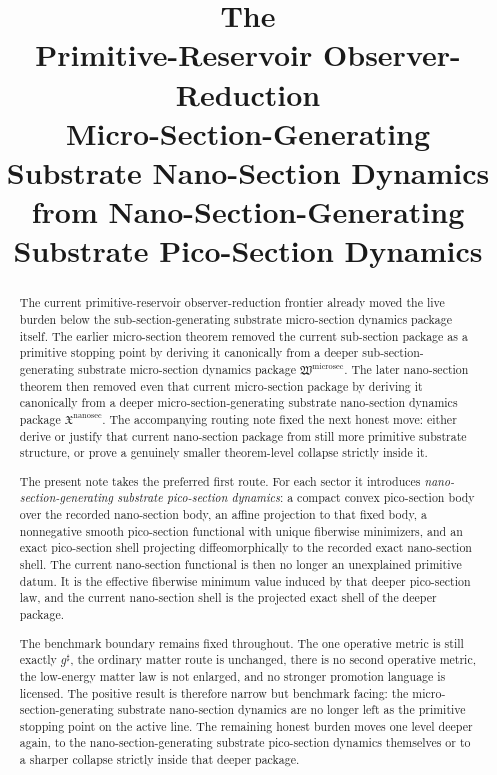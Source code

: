 \documentclass[11pt]{article}
\title{\textbf{The \TheoryName{}}\\[0.4em]
\large Primitive-Reservoir Observer-Reduction\\
\large Micro-Section-Generating Substrate Nano-Section Dynamics\\
\large from Nano-Section-Generating Substrate Pico-Section Dynamics}
\author{}
\date{}
\newcommand{\CompletedMetric}{g^{\sharp}}
\newcommand{\MicroSectionPackage}{\mathfrak W^{\mathrm{microsec}}}
\newcommand{\NanoSectionPackage}{\mathfrak X^{\mathrm{nanosec}}}
\begin{document}
\maketitle

\begin{abstract}
The current primitive-reservoir observer-reduction frontier already moved the live burden below the sub-section-generating substrate micro-section dynamics package itself. The earlier micro-section theorem removed the current sub-section package as a primitive stopping point by deriving it canonically from a deeper sub-section-generating substrate micro-section dynamics package \(\MicroSectionPackage\). The later nano-section theorem then removed even that current micro-section package by deriving it canonically from a deeper micro-section-generating substrate nano-section dynamics package \(\NanoSectionPackage\). The accompanying routing note fixed the next honest move: either derive or justify that current nano-section package from still more primitive substrate structure, or prove a genuinely smaller theorem-level collapse strictly inside it.

The present note takes the preferred first route. For each sector it introduces \emph{nano-section-generating substrate pico-section dynamics}: a compact convex pico-section body over the recorded nano-section body, an affine projection to that fixed body, a nonnegative smooth pico-section functional with unique fiberwise minimizers, and an exact pico-section shell projecting diffeomorphically to the recorded exact nano-section shell. The current nano-section functional is then no longer an unexplained primitive datum. It is the effective fiberwise minimum value induced by that deeper pico-section law, and the current nano-section shell is the projected exact shell of the deeper package.

The benchmark boundary remains fixed throughout. The one operative metric is still exactly \(\CompletedMetric\), the ordinary matter route is unchanged, there is no second operative metric, the low-energy matter law is not enlarged, and no stronger promotion language is licensed. The positive result is therefore narrow but benchmark facing: the micro-section-generating substrate nano-section dynamics are no longer left as the primitive stopping point on the active line. The remaining honest burden moves one level deeper again, to the nano-section-generating substrate pico-section dynamics themselves or to a sharper collapse strictly inside that deeper package.
\end{abstract}
\end{document}
